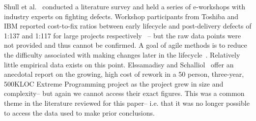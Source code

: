 \documentclass[smallcondensed]{svjour3}
\begin{document}





 

Shull et al.~\cite{Shull02} conducted a literature survey and held a series of e-workshops with industry experts on fighting defects. Workshop participants from Toshiba and IBM reported cost-to-fix ratios between early lifecycle and post-delivery defects of 1:137 and 1:117 for large projects respectively~\cite{Shull02} -- but the raw data points were not provided and thus cannot be confirmed. A goal of agile methods 
is to reduce the difficulty associated with making changes later in the lifecycle~\cite{beck00}. Relatively little empirical data exists on this point.
Elssamadisy and Schalliol~\cite{Elssamadisy02} offer an anecdotal report on the growing, high cost of rework in a 50 person, three-year, 500KLOC Extreme Programming project as the project grew in size and complexity-- but again we cannot access their 
exact figures. This was a common theme in the literature reviewed for this paper-- i.e.  that  it was no longer possible to access the data used to make prior conclusions. 





 
\end{document}
